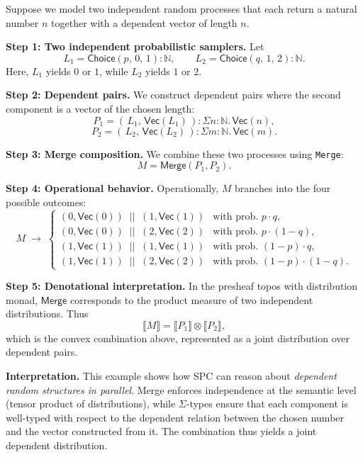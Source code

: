 \documentclass{article}
\begin{document}
Suppose we model two independent random processes that each return a natural
number $n$ together with a dependent vector of length $n$.  

\medskip
\textbf{Step 1: Two independent probabilistic samplers.}  
Let
\[
L_1 = \mathsf{Choice}(p,\,0,\,1) : \mathbb{N},
\qquad
L_2 = \mathsf{Choice}(q,\,1,\,2) : \mathbb{N}.
\]
Here, $L_1$ yields $0$ or $1$, while $L_2$ yields $1$ or $2$.

\medskip
\textbf{Step 2: Dependent pairs.}  
We construct dependent pairs where the second component is a vector of the
chosen length:
\[
P_1 = (\,L_1,\, \mathsf{Vec}(L_1)\,) : \Sigma n:\mathbb{N}.\,\mathsf{Vec}(n),
\]
\[
P_2 = (\,L_2,\, \mathsf{Vec}(L_2)\,) : \Sigma m:\mathbb{N}.\,\mathsf{Vec}(m).
\]

\medskip
\textbf{Step 3: Merge composition.}  
We combine these two processes using \texttt{Merge}:
\[
M = \mathsf{Merge}(P_1, P_2).
\]

\medskip
\textbf{Step 4: Operational behavior.}  
Operationally, $M$ branches into the four possible outcomes:
\[
M \;\to\; \begin{cases}
(0,\mathsf{Vec}(0)) \;\;||\;\; (1,\mathsf{Vec}(1)) & \text{with prob.\ } p \cdot q, \\[4pt]
(0,\mathsf{Vec}(0)) \;\;||\;\; (2,\mathsf{Vec}(2)) & \text{with prob.\ } p \cdot (1-q), \\[4pt]
(1,\mathsf{Vec}(1)) \;\;||\;\; (1,\mathsf{Vec}(1)) & \text{with prob.\ } (1-p) \cdot q, \\[4pt]
(1,\mathsf{Vec}(1)) \;\;||\;\; (2,\mathsf{Vec}(2)) & \text{with prob.\ } (1-p)\cdot(1-q).
\end{cases}
\]

\medskip
\textbf{Step 5: Denotational interpretation.}  
In the presheaf topos with distribution monad, $\mathsf{Merge}$ corresponds to
the product measure of two independent distributions. Thus
\[
\llbracket M \rrbracket
= \llbracket P_1 \rrbracket \otimes \llbracket P_2 \rrbracket,
\]
which is the convex combination above, represented as a joint distribution over
dependent pairs.

\medskip
\textbf{Interpretation.}  
This example shows how SPC can reason about \emph{dependent random structures in
parallel}. Merge enforces independence at the semantic level (tensor product of
distributions), while $\Sigma$-types ensure that each component is well-typed
with respect to the dependent relation between the chosen number and the vector
constructed from it. The combination thus yields a joint dependent distribution.
\end{document}
